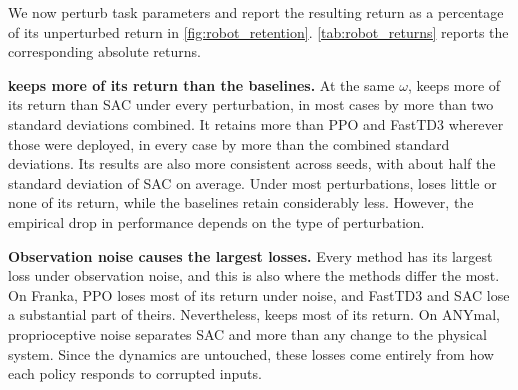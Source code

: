 





We now perturb task parameters and report the resulting return as a percentage of its unperturbed return in \autoref{fig:robot_retention}.
\autoref{tab:robot_returns} reports the corresponding absolute returns.

\textbf{\ourMethod keeps more of its return than the baselines.}
At the same $\omega$, \ourMethod keeps more of its return than SAC under every perturbation, in most cases by more than two standard deviations combined.
It retains more than PPO and FastTD3 wherever those were deployed, in every case by more than the combined standard deviations.
Its results are also more consistent across seeds, with about half the standard deviation of SAC on average. Under most perturbations, \ourMethod loses little or none of its return, while the baselines retain considerably less. However, the empirical drop in performance depends on the type of perturbation.

\textbf{Observation noise causes the largest losses.}
Every method has its largest loss under observation noise, and this is also where the methods differ the most. On Franka, PPO loses most of its return under noise, and FastTD3 and SAC lose a substantial part of theirs. Nevertheless, \ourMethod keeps most of its return.
On ANYmal, proprioceptive noise separates SAC and \ourMethod more than any change to the physical system. Since the dynamics are untouched, these losses come entirely from how each policy responds to corrupted inputs.

